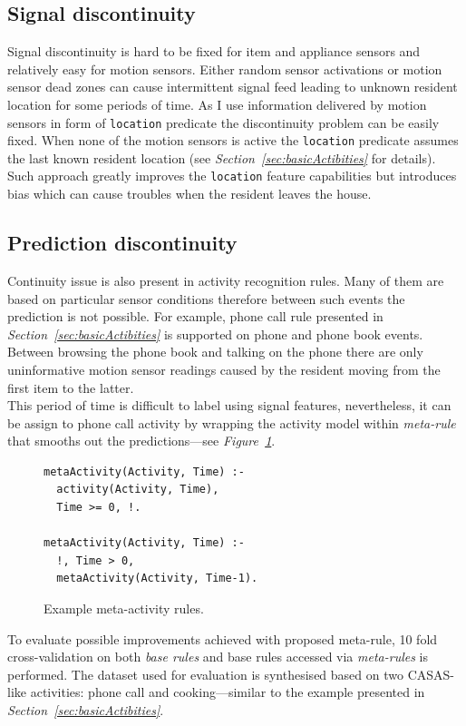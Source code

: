 \documentclass[10pt, a4paper, pdflatex, leqno, twoside, openright]{report}
\begin{document}
    \subsection{Signal discontinuity}
Signal discontinuity is hard to be fixed for item and appliance sensors and relatively easy for motion sensors. Either random sensor activations or motion sensor dead zones can cause intermittent signal feed leading to unknown resident location for some periods of time. As I use information delivered by motion sensors in form of \texttt{location} predicate the discontinuity problem can be easily fixed. When none of the motion sensors is active the \texttt{location} predicate assumes the last known resident location (see \emph{Section~\ref{sec:basicActibities}} for details). Such approach greatly improves the \texttt{location} feature capabilities but introduces bias which can cause troubles when the resident leaves the house.

    \subsection{Prediction discontinuity\label{sec:predDis}}
Continuity issue is also present in activity recognition rules. Many of them are based on particular sensor conditions therefore between such events the prediction is not possible. For example, phone call rule presented in \emph{Section~\ref{sec:basicActibities}} is supported on phone and phone book events. Between browsing the phone book and talking on the phone there are only uninformative motion sensor readings caused by the resident moving from the first item to the latter.\\
This period of time is difficult to label using signal features, nevertheless, it can be assign to phone call activity by wrapping the activity model within \emph{meta-rule} that smooths out the predictions---see \emph{Figure~\ref{lst:metaActivity}}.

\begin{figure}[htb]
  \begin{verbatim}
metaActivity(Activity, Time) :-
  activity(Activity, Time),
  Time >= 0, !.

metaActivity(Activity, Time) :-
  !, Time > 0,
  metaActivity(Activity, Time-1).
  \end{verbatim}
  \caption{Example meta-activity rules.\label{lst:metaActivity}}
\end{figure}

To evaluate possible improvements achieved with proposed meta-rule, 10 fold cross-validation on both \emph{base rules} and base rules accessed via \emph{meta-rules} is performed. The dataset used for evaluation is synthesised based on two CASAS-like activities: phone call and cooking---similar to the example presented in \emph{Section~\ref{sec:basicActibities}}.\\
\end{document}
